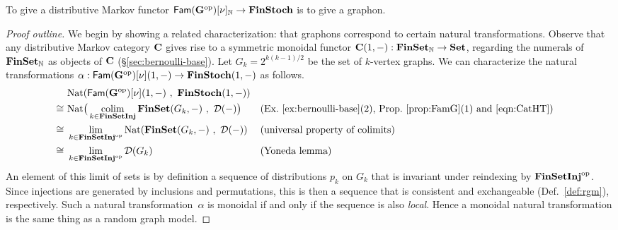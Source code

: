 \begin{theorem}\label{thm:Markov-functor-graphon}
  To give a distributive Markov functor $\mathsf{Fam}(\mathbf{G}^\mathrm{op})[\nu]_{\mathbb{N}} \to \mathbf{FinStoch}$ is to give a graphon.
\end{theorem}
\begin{proof}[Proof outline]
  We begin by showing a related characterization: that graphons correspond to certain natural transformations. 
  Observe that any distributive Markov category $\mathbf{C}$
  gives rise to a symmetric monoidal functor $\mathbf{C}(1,-):\mathbf{FinSet}_{\mathbb{N}}\to\mathbf{Set}$, regarding the numerals of $\mathbf{FinSet}_{\mathbb{N}}$ as objects of $\mathbf{C}$ (\S\ref{sec:bernoulli-base}). 
  Let $G_k=2^{k(k-1)/2}$ be the set of $k$-vertex graphs. 
  We can characterize the natural transformations $\alpha :
  \mathsf{Fam}(\mathbf{G}^\mathrm{op})[\nu](1,-) \to \mathbf{FinStoch}(1,-)$ as follows.
  \begin{align*}
    &     \Nat(\CatHT(1,-)\ ,\ \FinStoch(1,-))\\
    \cong\ &\Nat\big(\colim_{k\in\Inj}\FinSet(G_k,-)\ ,\ \DistM(-)\big)
    &&\text{(Ex.~\ref{ex:bernoulli-base}(2), Prop.~\ref{prop:FamG}(1) and \eqref{eqn:CatHT})}\\
    \cong\ &\lim_{k\in \Inj\op}\Nat(\FinSet(G_k,-)\ ,\ \DistM(-))&&\text{(universal property of colimits)}\\
    \cong\ &\lim_{k\in \Inj\op}\DistM(G_k)&&\text{(Yoneda lemma)}
  \end{align*}
  An element of this limit of sets is by definition a sequence of distributions $p_k$ on $G_k$ that is invariant under reindexing by $\mathbf{FinSetInj}^\mathrm{op}$. Since injections are generated by inclusions and permutations, this is then a sequence that is consistent and exchangeable (Def.~\ref{def:rgm}), respectively.
  Such a natural transformation~$\alpha$ is monoidal if and only if
  the sequence is also \emph{local}. Hence a monoidal natural transformation is the
  same thing as a random graph model.


\end{proof}
